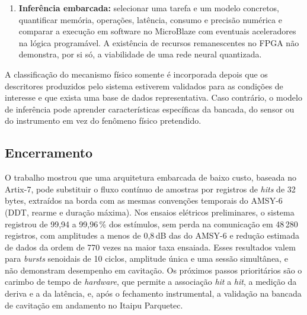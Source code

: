 \begin{enumerate}
	\item \textbf{Inferência embarcada:} selecionar uma tarefa e um modelo concretos, quantificar memória, operações, latência, consumo e precisão numérica e comparar a execução em software no MicroBlaze com eventuais aceleradores na lógica programável. A existência de recursos remanescentes no FPGA não demonstra, por si só, a viabilidade de uma rede neural quantizada.
\end{enumerate}

A classificação do mecanismo físico somente é incorporada depois que os descritores produzidos pelo sistema estiverem validados para as condições de interesse e que exista uma base de dados representativa. Caso contrário, o modelo de inferência pode aprender características específicas da bancada, do sensor ou do instrumento em vez do fenômeno físico pretendido.

\subsection{Encerramento}
\label{v2:subsec:encerramento_conclusao}

O trabalho mostrou que uma arquitetura embarcada de baixo custo, baseada no Artix-7, pode substituir o fluxo contínuo de amostras por registros de \textit{hits} de 32 bytes, extraídos na borda com as mesmas convenções temporais do AMSY-6 (DDT, rearme e duração máxima). Nos ensaios elétricos preliminares, o sistema registrou de 99,94 a 99,96\,\% dos estímulos, sem perda na comunicação em 48\,280 registros, com amplitudes a menos de 0,8\,dB das do AMSY-6 e redução estimada de dados da ordem de 770 vezes na maior taxa ensaiada. Esses resultados valem para \textit{bursts} senoidais de 10 ciclos, amplitude única e uma sessão simultânea, e não demonstram desempenho em cavitação. Os próximos passos prioritários são o carimbo de tempo de \textit{hardware}, que permite a associação \textit{hit} a \textit{hit}, a medição da deriva e a da latência, e, após o fechamento instrumental, a validação na bancada de cavitação em andamento no Itaipu Parquetec.


